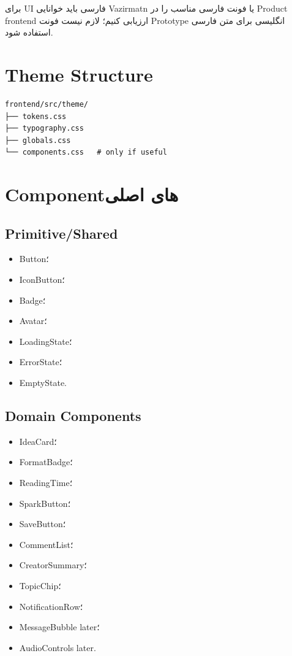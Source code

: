 برای UI فارسی باید خوانایی Vazirmatn یا فونت فارسی مناسب را در Product frontend ارزیابی کنیم؛ لازم نیست فونت Prototype انگلیسی برای متن فارسی استفاده شود.

\section{Theme Structure}

\begin{latin}
\begin{lstlisting}
frontend/src/theme/
├── tokens.css
├── typography.css
├── globals.css
└── components.css   # only if useful
\end{lstlisting}
\end{latin}

\section{Componentهای اصلی}

\subsection{Primitive/Shared}

\begin{itemize}
  \item Button؛
  \item IconButton؛
  \item Badge؛
  \item Avatar؛
  \item LoadingState؛
  \item ErrorState؛
  \item EmptyState.
\end{itemize}

\subsection{Domain Components}

\begin{itemize}
  \item IdeaCard؛
  \item FormatBadge؛
  \item ReadingTime؛
  \item SparkButton؛
  \item SaveButton؛
  \item CommentList؛
  \item CreatorSummary؛
  \item TopicChip؛
  \item NotificationRow؛
  \item MessageBubble later؛
  \item AudioControls later.
\end{itemize}

